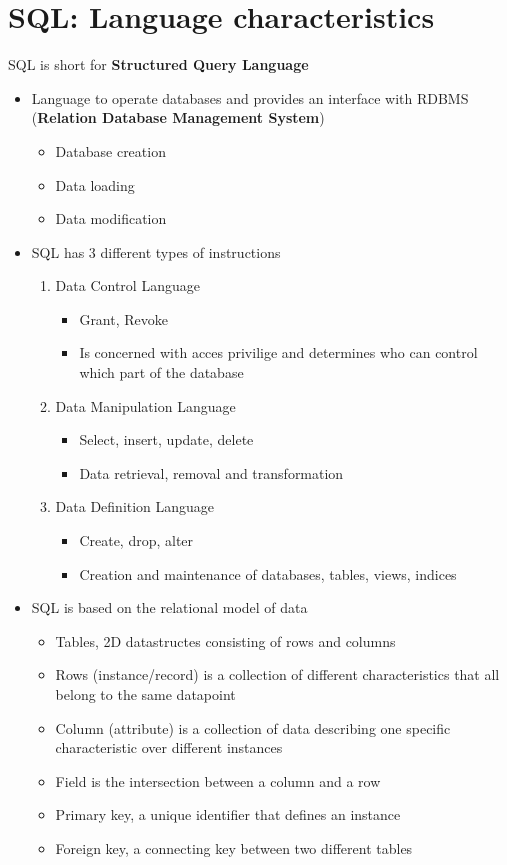\documentclass{article}
\begin{document}
\section{SQL: Language characteristics}

SQL is short for \textbf{Structured Query Language}
\begin{itemize}
    \item Language to operate databases and provides an interface with RDBMS (\textbf{Relation Database Management System})
    \begin{itemize}
        \item Database creation
        \item Data loading
        \item Data modification
    \end{itemize}
    \item SQL has 3 different types of instructions 
    \begin{enumerate}
        \item Data Control Language 
        \begin{itemize}
            \item Grant, Revoke
            \item Is concerned with acces privilige and determines who can control which part of the database 
        \end{itemize}
        \item Data Manipulation Language 
        \begin{itemize}
            \item Select, insert, update, delete
            \item Data retrieval, removal and transformation
        \end{itemize}
        \item Data Definition Language
        \begin{itemize}
            \item Create, drop, alter
            \item Creation and maintenance of databases, tables, views, indices
        \end{itemize}
    \end{enumerate}
    \item SQL is based on the relational model of data
    \begin{itemize}
        \item Tables, 2D datastructes consisting of rows and columns 
        \item Rows (instance/record) is a collection of different characteristics that all belong to the same datapoint
        \item Column (attribute) is a collection of data describing one specific characteristic over different instances
        \item Field is the intersection between a column and a row 
        \item Primary key, a unique identifier that defines an instance 
        \item Foreign key, a connecting key between two different tables
    \end{itemize}
\end{itemize}
\end{document}
